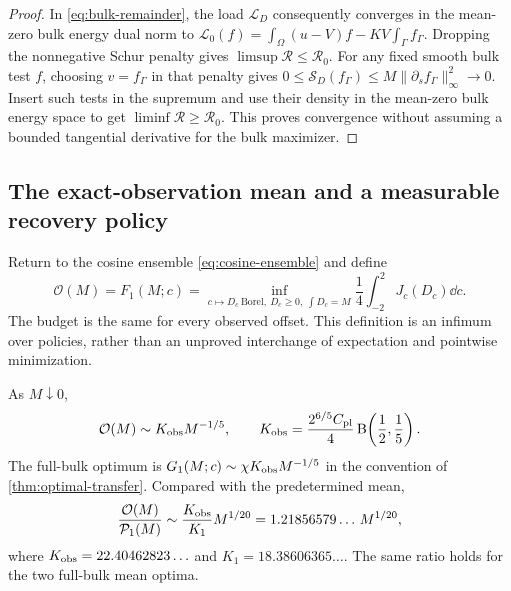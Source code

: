 \begin{proof}
In \eqref{eq:bulk-remainder}, the load $\mathcal L_D$ consequently
converges in the mean-zero bulk energy dual norm to
$\mathcal L_0(f)=\int_\Omega(u-V)f-KV\int_\Gamma f_\Gamma$.
Dropping the nonnegative Schur penalty gives
$\limsup\mathcal R\le\mathcal R_0$.
For any fixed smooth bulk test $f$, choosing $v=f_\Gamma$ in that
penalty gives
$0\le\mathcal S_D(f_\Gamma)\le M\|\partial_sf_\Gamma\|_\infty^2\to0$.
Insert such tests in the supremum and use their density in the
mean-zero bulk energy space to get $\liminf\mathcal R\ge\mathcal R_0$.
This proves convergence without assuming a bounded tangential
derivative for the bulk maximizer.
\end{proof}

\subsection{The exact-observation mean and a measurable recovery policy}
Return to the cosine ensemble \eqref{eq:cosine-ensemble} and define
\begin{equation}\label{eq:oracle-value}
 \mathcal O(M)=F_1(M;c)
 =\inf_{c\mapsto D_c\ \mathrm{Borel},\ D_c\ge0,\ \int D_c=M}
      \frac14\int_{-2}^2J_c(D_c)\dd c.
\end{equation}
The budget is the same for every observed offset. This definition is
an infimum over policies, rather than an unproved interchange of
expectation and pointwise minimization.

\begin{theorem}\label{thm:oracle}
As $M\downarrow0$,
\begin{equation}\label{eq:oracle-sharp}
 \mathcal O(M)\sim K_{\rm obs}M^{-1/5},\qquad
 K_{\rm obs}=\frac{2^{6/5}C_{\rm pl}}4
                 \operatorname{B}\!\left(\frac12,\frac15\right).
\end{equation}
The full-bulk optimum is
$G_1(M;c)\sim\chi K_{\rm obs}M^{-1/5}$ in the convention of
\cref{thm:optimal-transfer}. Compared with the predetermined mean,
\begin{equation}\label{eq:oracle-blind-ratio}
 \frac{\mathcal O(M)}{\mathcal P_1(M)}
 \sim\frac{K_{\rm obs}}{K_1}M^{1/20}
 =1.21856579\ldots\,M^{1/20},
\end{equation}
where $K_{\rm obs}=22.40462823\ldots$ and $K_1=18.38606365\ldots$.
The same ratio holds for the two full-bulk mean optima.
\end{theorem}

